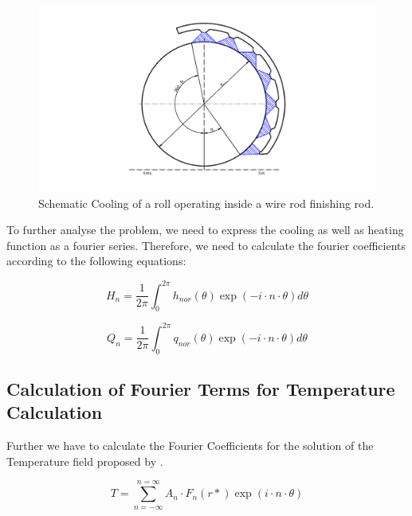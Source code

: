 \documentclass[11pt]{PyRollDocs}
\begin{document}
    \begin{figure}
        \centering
        \includegraphics[width=\textwidth]{img/cooling_finishing_block}
        \caption{Schematic Cooling of a roll operating inside a wire rod finishing rod.}
        \label{fig:1}
    \end{figure}

    To further analyse the problem, we need to express the cooling as well as heating function as a fourier series.
    Therefore, we need to calculate the fourier coefficients according to the following equations:

    \begin{equation}
        H_n = \frac{1}{2 \pi} \int_{0}^{2 \pi} h_{nor}(\theta) \exp\left( -i \cdot n \cdot \theta \right)d\theta
        \label{eq:3}
    \end{equation}

    \begin{equation}
        Q_n = \frac{1}{2 \pi} \int_{0}^{2 \pi} q_{nor}(\theta) \exp\left( -i \cdot n \cdot \theta \right)d\theta
        \label{eq:4}
    \end{equation}

    \subsection*{Calculation of Fourier Terms for Temperature Calculation}
    Further we have to calculate the Fourier Coefficients for the solution of the Temperature field proposed by \textcite{Patula1981}.

    \begin{equation}
        T = \sum_{n=-\infty}^{n=\infty} A_n \cdot F_n(r*) \exp\left(i \cdot n \cdot \theta \right)
        \label{eq:5}
    \end{equation}
\end{document}
